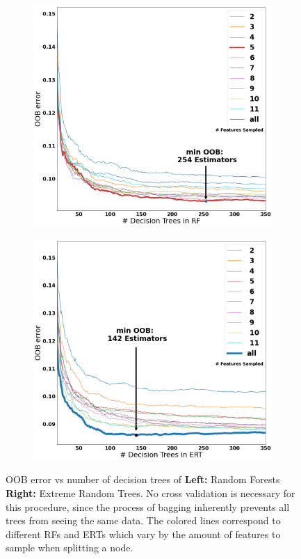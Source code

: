 \documentclass[a4paper, twoside, final, 12pt]{article}
\begin{document}
{\begin{figure}[h]
	\begin{subfigure}{0.48\linewidth}
		\centering
		\includegraphics[scale=0.2]{./src/RF_oob_error}
	\end{subfigure}
	\begin{subfigure}{0.5\linewidth}
		\centering
		\includegraphics[scale=0.2]{./src/ERT_oob_error}
	\end{subfigure}
	\caption{OOB error vs number of decision trees of \textbf{Left:} Random Forests \textbf{Right:} Extreme Random Trees. No cross validation is necessary for this procedure, since the process of bagging inherently prevents all trees from seeing the same data. The colored lines correspond to different RFs and ERTs which vary by the amount of features to sample when splitting a node.}
	\label{fig:RF_exp}
\end{figure}

}
\end{document}
